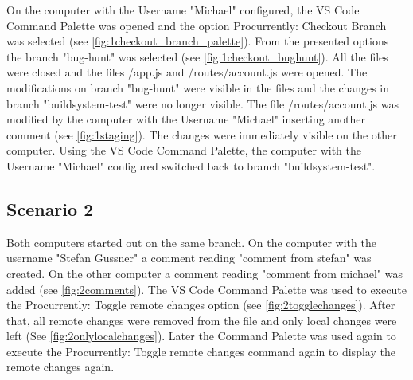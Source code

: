 On the computer with the Username "Michael" configured, the VS Code Command Palette was opened and the option Procurrently: Checkout Branch was selected (see \autoref{fig:1checkout_branch_palette}). From the presented options the branch "bug-hunt" was selected (see \autoref{fig:1checkout_bughunt}). All the files were closed and the files /app.js and /routes/account.js were opened. The modifications on branch "bug-hunt" were visible in the files and the changes in branch "buildsystem-test" were no longer visible. The file /routes/account.js was modified by the computer with the Username "Michael" inserting another comment (see \autoref{fig:1staging}). The changes were immediately visible on the other computer. Using the VS Code Command Palette, the computer with the Username "Michael" configured switched back to branch "buildsystem-test".

\subsection{Scenario 2}

Both computers started out on the same branch. On the computer with the username "Stefan Gussner" a comment reading "comment from stefan" was created. On the other computer a comment reading "comment from michael" was added (see \autoref{fig:2comments}). The VS Code Command Palette was used to execute the Procurrently: Toggle remote changes option (see \autoref{fig:2togglechanges}). After that, all remote changes were removed from the file and only local changes were left (See \autoref{fig:2onlylocalchanges}). Later the Command Palette was used again to execute the Procurrently: Toggle remote changes command again to display the remote changes again.

